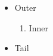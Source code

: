 \documentclass{article}
\begin{document}
\begin{itemize}
\item Outer
  \begin{enumerate}
  \item Inner
  \end{enumerate}
\item Tail
\end{itemize}
\end{document}
